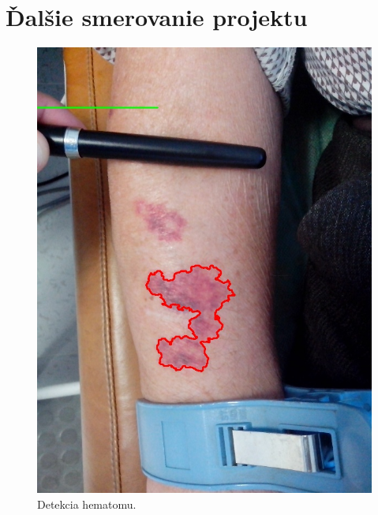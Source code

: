 \section{Ďalšie smerovanie projektu}
\begin{figure}[h]
  \centering
  \includegraphics[scale=0.4]{fig/2o.jpeg}
  \caption{Detekcia hematomu.}
  \label{fig:2o}
\end{figure}
